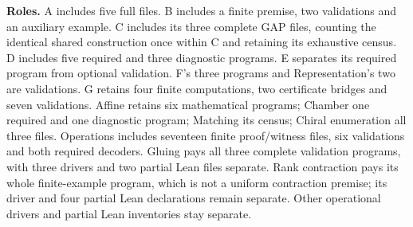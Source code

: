\documentclass[11pt,a4paper]{article}
\begin{document}
\textbf{Roles.} A includes five full files. B includes a finite premise, two validations and an auxiliary example. C includes its three complete GAP files, counting the identical shared construction once within C and retaining its exhaustive census. D includes five required and three diagnostic programs. E separates its required program from optional validation. F's three programs and Representation's two are validations. G retains four finite computations, two certificate bridges and seven validations. Affine retains six mathematical programs; Chamber one required and one diagnostic program; Matching its census; Chiral enumeration all three files. Operations includes seventeen finite proof/witness files, six validations and both required decoders. Gluing pays all three complete validation programs, with three drivers and two partial Lean files separate. Rank contraction pays its whole finite-example program, which is not a uniform contraction premise; its driver and four partial Lean declarations remain separate. Other operational drivers and partial Lean inventories stay separate.
\end{document}
